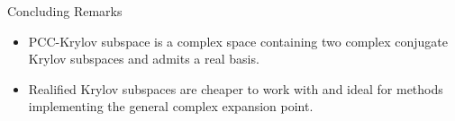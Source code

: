 \documentclass[serif]{beamer}
\begin{document}
 \begin{frame}{Concluding Remarks}
 \begin{itemize}
 \item PCC-Krylov subspace is a complex space containing two 
 complex conjugate Krylov subspaces and admits a real basis.
 \item Realified Krylov subspaces are cheaper to work with and ideal
 for methods implementing the general complex expansion point.
 \end{itemize}
 \end{frame}

% 
%
\end{document}
